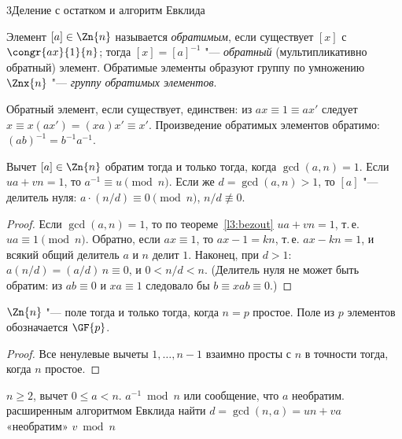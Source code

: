 \begin{lecture}{3}{Деление с остатком и алгоритм Евклида}
\begin{definition}
Элемент $[a] \in \Zn{n}$ называется \emph{обратимым}, если существует $[x]$ с
$\congr{ax}{1}{n}$; тогда $[x] = [a]^{-1}$ "--- \emph{обратный} (мультипликативно обратный)
элемент. Обратимые элементы образуют группу по умножению $\Znx{n}$ "--- \emph{группу обратимых
элементов}.
\end{definition}

Обратный элемент, если существует, единствен: из $ax \equiv 1 \equiv ax'$ следует
$x \equiv x(ax') = (xa)x' \equiv x'$. Произведение обратимых элементов обратимо:
$(ab)^{-1} = b^{-1}a^{-1}$.

\begin{theorem}\label{l3:invertible}
Вычет $[a] \in \Zn{n}$ обратим тогда и только тогда, когда $\gcd(a, n) = 1$. Если
$ua + vn = 1$, то $a^{-1} \equiv u \pmod n$. Если же $d = \gcd(a, n) > 1$, то $[a]$ "--- делитель
нуля: $a \cdot (n/d) \equiv 0 \pmod n$, $n/d \not\equiv 0$.
\end{theorem}

\begin{proof}
Если $\gcd(a, n) = 1$, то по теореме~\ref{l3:bezout} $ua + vn = 1$, т.\,е. $ua \equiv 1 \pmod n$.
Обратно, если $ax \equiv 1$, то $ax - 1 = kn$, т.\,е. $ax - kn = 1$, и всякий общий делитель
$a$ и $n$ делит $1$. Наконец, при $d > 1$: $a (n/d) = (a/d)\,n \equiv 0$, и $0 < n/d < n$.
(Делитель нуля не может быть обратим: из $ab \equiv 0$ и $xa \equiv 1$ следовало бы
$b \equiv xab \equiv 0$.)
\end{proof}

\begin{corollary}
$\Zn{n}$ "--- поле тогда и только тогда, когда $n = p$ простое. Поле из $p$ элементов
обозначается $\GF{p}$.
\end{corollary}

\begin{proof}
Все ненулевые вычеты $1, \dots, n - 1$ взаимно просты с $n$ в точности тогда, когда $n$ простое.
\end{proof}

\begin{algorithm}\label{l3:inv-alg}
\begin{algorithmic}[1]
\Require $n \ge 2$, вычет $0 \le a < n$.
\Ensure $a^{-1} \bmod n$ или сообщение, что $a$ необратим.
\State расширенным алгоритмом Евклида найти $d = \gcd(n, a) = un + va$ 
 \State \Return «необратим» \EndIf
\State \Return $v \bmod n$
\end{algorithmic}
\end{algorithm}


\end{lecture}
